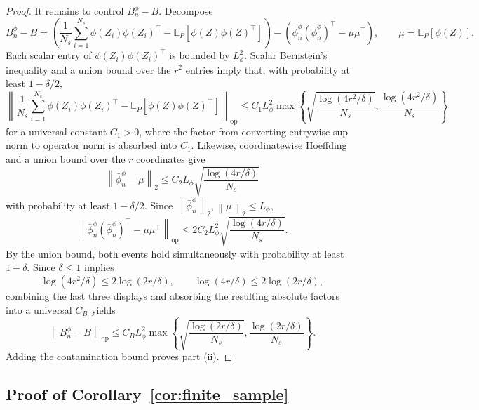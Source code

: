 \documentclass{article}
\newcommand{\EE}{\mathbb{E}}
\newcommand{\norm}[1]{\left\lVert #1 \right\rVert}
\newcommand{\paren}[1]{\left( #1 \right)}
\newcommand{\braces}[1]{\left\{ #1 \right\}}
\begin{document}
\begin{proof}
It remains to control \(B_n^\phi-B\). Decompose
\[
B_n^\phi-B
=
\paren{
\frac{1}{N_s}\sum_{i=1}^{N_s}\phi(Z_i)\phi(Z_i)^\top - \EE_P[\phi(Z)\phi(Z)^\top]
}
-
\paren{
\bar\phi_n^\phi(\bar\phi_n^\phi)^\top - \mu\mu^\top
},
\qquad
\mu=\EE_P[\phi(Z)].
\]
Each scalar entry of \(\phi(Z_i)\phi(Z_i)^\top\) is bounded by \(L_\phi^2\). Scalar Bernstein's inequality and a union bound over the \(r^2\) entries imply that, with probability at least \(1-\delta/2\),
\[
\norm{
\frac{1}{N_s}\sum_{i=1}^{N_s}\phi(Z_i)\phi(Z_i)^\top - \EE_P[\phi(Z)\phi(Z)^\top]
}_{\mathrm{op}}
\le
C_1 L_\phi^2
\max\braces{
\sqrt{\frac{\log(4r^2/\delta)}{N_s}},
\frac{\log(4r^2/\delta)}{N_s}
}
\]
for a universal constant \(C_1>0\), where the factor from converting entrywise sup norm to operator norm is absorbed into \(C_1\). Likewise, coordinatewise Hoeffding and a union bound over the \(r\) coordinates give
\[
\norm{\bar\phi_n^\phi-\mu}_2
\le
C_2 L_\phi \sqrt{\frac{\log(4r/\delta)}{N_s}}
\]
with probability at least \(1-\delta/2\). Since \(\norm{\bar\phi_n^\phi}_2,\norm{\mu}_2\le L_\phi\),
\[
\norm{\bar\phi_n^\phi(\bar\phi_n^\phi)^\top - \mu\mu^\top}_{\mathrm{op}}
\le
2C_2 L_\phi^2 \sqrt{\frac{\log(4r/\delta)}{N_s}}.
\]
By the union bound, both events hold simultaneously with probability at least \(1-\delta\). Since \(\delta\le 1\) implies
\[
\log(4r^2/\delta)\le 2\log(2r/\delta),
\qquad
\log(4r/\delta)\le 2\log(2r/\delta),
\]
combining the last three displays and absorbing the resulting absolute factors into a universal \(C_B\) yields
\[
\norm{B_n^\phi-B}_{\mathrm{op}}
\le
C_B L_\phi^2
\max\braces{
\sqrt{\frac{\log(2r/\delta)}{N_s}},
\frac{\log(2r/\delta)}{N_s}
}.
\]
Adding the contamination bound proves part (ii).
\end{proof}

\subsection{Proof of Corollary~\ref{cor:finite_sample}}
\end{document}
